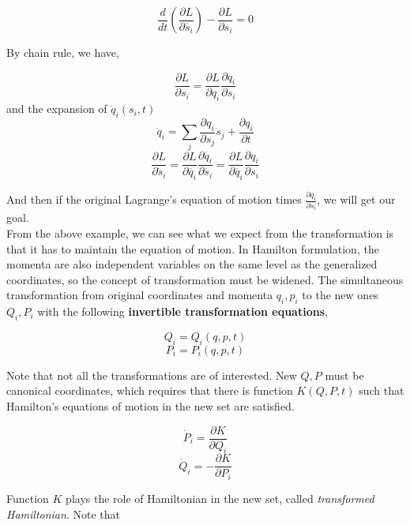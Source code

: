 \documentclass[12pt]{article}
\begin{document}
\begin{center}
    \[ \frac{d}{dt} \left( \frac{\partial L}{\partial \dot{s_i}} \right) - \frac{\partial L}{\partial s_i} = 0 \]
\end{center}

By chain rule, we have,

\begin{center}
    \[ \frac{\partial L}{\partial s_i} = \frac{\partial L}{\partial q_i}\frac{\partial q_i}{\partial s_i} \]
    and the expansion of $\dot{q}_i(s_i, t)$
    \[ \dot{q}_i = \sum_{j}{\frac{\partial q_i}{\partial s_j} \dot{s}_j} + \frac{\partial q_i}{\partial t} \]
    \[ \frac{\partial L}{\partial \dot{s}_i} = \frac{\partial L}{\partial \dot{q_i}} \frac{\partial \dot{q_i}}{\partial \dot{s_i}} = \frac{\partial L}{\partial \dot{q_i}} \frac{\partial q_i}{\partial s_i} \]
\end{center}

And then if the original Lagrange's equation of motion times $\frac{\partial q_i}{\partial s_i}$, we will get our goal.
\\
From the above example, we can see what we expect from the transformation is that it has to maintain the equation of motion. In Hamilton formulation, the momenta are also independent variables on the same level as the generalized coordinates, so the concept of transformation must be widened. The simultaneous transformation from original coordinates and momenta $q_i, p_i$ to the new ones $Q_i, P_i$ with the following \textbf{invertible transformation equations},

\begin{center}
    \[ Q_i = Q_i(q, p, t) \]
    \[ P_i = P_i(q, p, t) \]
\end{center}

Note that not all the transformations are of interested. New $Q, P$ must be canonical coordinates, which requires that there is function $K(Q, P, t)$ such that Hamilton's equations of motion in the new set are satisfied.

\begin{center}
    \[ \dot{P}_i = \frac{\partial K}{\partial Q_i} \]
    \[ \dot{Q}_i = - \frac{\partial K}{\partial P_i} \]
\end{center}

Function $K$ plays the role of Hamiltonian in the new set, called \textit{transformed Hamiltonian}. Note that 
\end{document}
